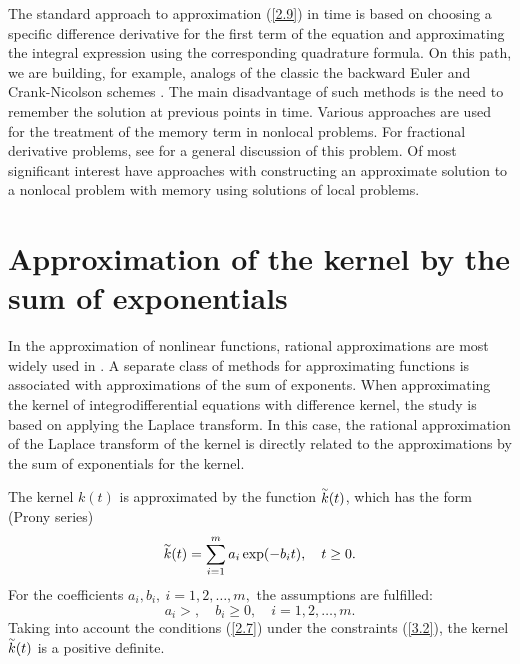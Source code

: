 \documentclass[3p]{elsarticle}
\numberwithin{equation}{section}
\begin{document}
The standard approach to approximation (\ref{2.9}) in time is based on choosing a specific difference derivative for the first term of the equation and approximating the integral expression using the corresponding quadrature formula.
On this path, we are building, for example, analogs of the classic the backward Euler and Crank-Nicolson schemes \cite{mclean1993numerical,mclean1996discretization}.
The main disadvantage of such methods is the need to remember the solution at previous points in time.
Various approaches are used for the treatment of the memory term in nonlocal problems.
For fractional derivative problems, see \cite{diethelm2020good} for a general discussion of this problem.
Of most significant interest have approaches with constructing an approximate solution to a nonlocal problem with memory using solutions of local problems.

\section{Approximation of the kernel by the sum of exponentials}\label{sec:3}

In the approximation of nonlinear functions, rational approximations are most widely used in \cite{braess1986nonlinear}.
A separate class of methods for approximating functions is associated with approximations of the sum of exponents.
When approximating the kernel of integrodifferential equations with difference kernel, the study is based on applying the Laplace transform.
In this case, the rational approximation of the Laplace transform of the kernel is directly related to the approximations by the sum of exponentials for the kernel.
 
The kernel $k(t)$ is approximated by the function $\accentset {\sim}{k}(t)$, which has the form (Prony series)
\begin{equation}\label{3.1}
 \accentset{\sim }{k}(t) = \sum_{i=1}^{m} a_i \exp(-b_i t),
 \quad t \geq 0 . 
\end{equation} 
For the coefficients $a_i, b_i, \ i = 1,2,\ldots, m,$ the assumptions are fulfilled:
\begin{equation}\label{3.2}
 a_i > ,
 \quad b_i \geq  0,
 \quad   i = 1,2,\ldots, m .
\end{equation} 
Taking into account the conditions (\ref{2.7}) under the constraints (\ref{3.2}), the kernel $\accentset {\sim}{k}(t) $ is a positive definite.
\end{document}
